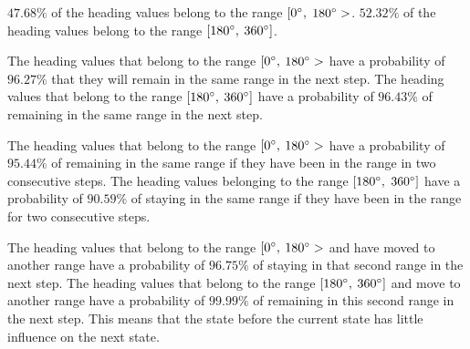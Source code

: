 \documentclass[preprint,12pt]{elsarticle}
\begin{document}
$47.68\%$ of the heading values belong to the range $[0 \degree,$ $180 \degree>$. $52.32\%$ of the heading values belong to the range $[180 \degree,$ $360 \degree]$.

The heading values that belong to the range $[0 \degree,$ $180 \degree>$ have a probability of $96.27\%$ that they will remain in the same range in the next step. The heading values that belong to the range $[180 \degree,$ $360 \degree]$ have a probability of $96.43\%$ of remaining in the same range in the next step.

The heading values that belong to the range $[0 \degree,$ $180 \degree>$ have a probability of $95.44\%$ of remaining in the same range if they have been in the range in two consecutive steps. The heading values belonging to the range $[180 \degree,$ $360 \degree]$ have a probability of $90.59\%$ of staying in the same range if they have been in the range for two consecutive steps.

The heading values that belong to the range $[0 \degree,$ $180 \degree>$ and have moved to another range have a probability of $96.75\%$ of staying in that second range in the next step. The heading values that belong to the range $[180 \degree,$ $360 \degree]$ and move to another range have a probability of $99.99\%$ of remaining in this second range in the next step. This means that the state before the current state has little influence on the next state.
\end{document}
